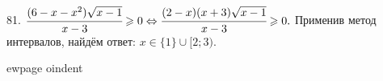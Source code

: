 81. $\cfrac{(6-x-x^2)\sqrt{x-1}}{x-3}\geqslant0\Leftrightarrow\cfrac{(2-x)(x+3)\sqrt{x-1}}{x-3}\geqslant0.$ Применив метод интервалов, найдём ответ: $x\in\{1\}\cup[2;3).$
\begin{figure}[ht!]
\end{figure}
ewpage
oindent
